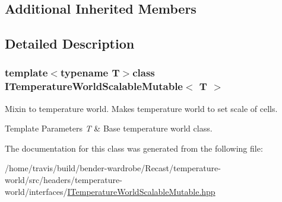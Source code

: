 \subsection*{Additional Inherited Members}


\subsection{Detailed Description}
\subsubsection*{template$<$typename T$>$class I\-Temperature\-World\-Scalable\-Mutable$<$ T $>$}

Mixin to temperature world. Makes temperature world to set scale of cells.


\begin{DoxyTemplParams}{Template Parameters}
{\em T} & Base temperature world class. \\
\hline
\end{DoxyTemplParams}


The documentation for this class was generated from the following file\-:\begin{DoxyCompactItemize}
\item 
/home/travis/build/bender-\/wardrobe/\-Recast/temperature-\/world/src/headers/temperature-\/world/interfaces/\hyperlink{_i_temperature_world_scalable_mutable_8hpp}{I\-Temperature\-World\-Scalable\-Mutable.\-hpp}\end{DoxyCompactItemize}
